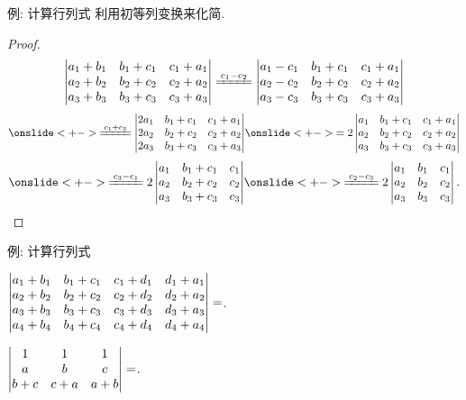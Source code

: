 \begin{frame}{例: 计算行列式}
	\onslide<+->
	利用初等列变换来化简.
	\onslide<+->
	\begin{proof}
		\[\detm{
			a_1+b_1&b_1+c_1&c_1+a_1\\
			a_2+b_2&b_2+c_2&c_2+a_2\\
			a_3+b_3&b_3+c_3&c_3+a_3
		}\xeq{c_1-c_2}\detm{
			a_1-c_1&b_1+c_1&c_1+a_1\\
			a_2-c_2&b_2+c_2&c_2+a_2\\
			a_3-c_3&b_3+c_3&c_3+a_3
		}\]\[
		\onslide<+->{\xeq{c_1+c_3}\detm{
			2a_1&b_1+c_1&c_1+a_1\\
			2a_2&b_2+c_2&c_2+a_2\\
			2a_3&b_3+c_3&c_3+a_3
		}}
		\onslide<+->{=2\detm{
			a_1&b_1+c_1&c_1+a_1\\
			a_2&b_2+c_2&c_2+a_2\\
			a_3&b_3+c_3&c_3+a_3
		}}\]\[
		\onslide<+->{\xeq{c_3-c_1}2\detm{
			a_1&b_1+c_1&c_1\\
			a_2&b_2+c_2&c_2\\
			a_3&b_3+c_3&c_3
		}}
		\onslide<+->{\xeq{c_2-c_3}2\detm{
			a_1&b_1&c_1\\
			a_2&b_2&c_2\\
			a_3&b_3&c_3
		}.}\qedhere\]
	\end{proof}
\end{frame}


\begin{frame}{例: 计算行列式}
	\onslide<+->
	\begin{exercise}
		$\left|\begin{matrix}
			a_1+b_1&b_1+c_1&c_1+d_1&d_1+a_1\\
			a_2+b_2&b_2+c_2&c_2+d_2&d_2+a_2\\
			a_3+b_3&b_3+c_3&c_3+d_3&d_3+a_3\\
			a_4+b_4&b_4+c_4&c_4+d_4&d_4+a_4
		\end{matrix}\right|=$.
	\end{exercise}
	\onslide<+->
	\begin{exercise}
		$\left|\begin{matrix}
			1&1&1\\
			a&b&c\\
			b+c&c+a&a+b
		\end{matrix}\right|=$\fillblank{\visible<+->{$0$}}.
	\end{exercise}
\end{frame}


